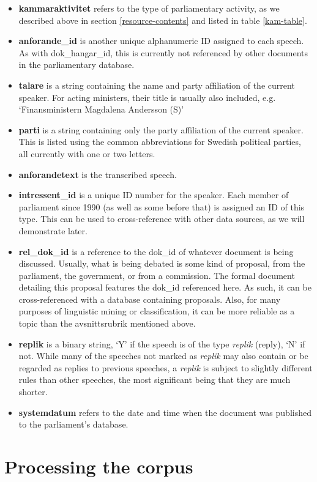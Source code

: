 \begin{itemize}
    \item \textbf{kammaraktivitet} refers to the type of parliamentary activity, as we described above in section \ref{resource-contents} and listed in table \ref{kam-table}.
    \item \textbf{anforande\_id} is another unique alphanumeric ID assigned to each speech. As with dok\_hangar\_id, this is currently not referenced by other documents in the parliamentary database.
    \item \textbf{talare} is a string containing the name and party affiliation of the current speaker. For acting ministers, their title is usually also included, e.g. `Finansministern Magdalena Andersson (S)'
    \item \textbf{parti} is a string containing only the party affiliation of the current speaker. This is listed using the common abbreviations for Swedish political parties, all currently with one or two letters.
    \item \textbf{anforandetext} is the transcribed speech.
    \item \textbf{intressent\_id} is a unique ID number for the speaker. Each member of parliament since 1990 (as well as some before that) is assigned an ID of this type. This can be used to cross-reference with other data sources, as we will demonstrate later.
    \item \textbf{rel\_dok\_id} is a reference to the dok\_id of whatever document is being discussed. Usually, what is being debated is some kind of proposal, from the parliament, the government, or from a commission. The formal document detailing this proposal features the dok\_id referenced here. As such, it can be cross-referenced with a database containing proposals. Also, for many purposes of linguistic mining or classification, it can be more reliable as a topic than the avsnittsrubrik mentioned above.
    \item \textbf{replik} is a binary string, `Y' if the speech is of the type \emph{replik} (reply), `N' if not. While many of the speeches not marked as \emph{replik} may also contain or be regarded as replies to previous speeches, a \emph{replik} is subject to slightly different rules than other speeches, the most significant being that they are much shorter.
    \item \textbf{systemdatum} refers to the date and time when the document was published to the parliament's database.
\end{itemize}

\section{\label{processing-corpus}Processing the corpus}

